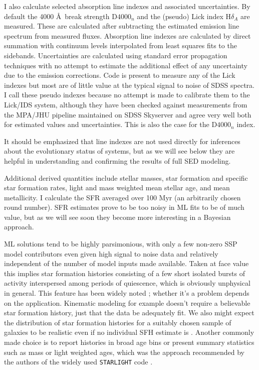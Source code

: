 \documentclass[modern]{aastex62}
\begin{document}
I also calculate selected absorption line indexes and associated uncertainties. By default the 4000 \AA~break strength D$4000_n$ \citep{1999ApJ...527...54B} and the (pseudo) Lick index H$\delta_A$ \citep{1997ApJS..111..377W} are measured. These are calculated after subtracting the estimated emission line spectrum from measured fluxes. Absorption line indexes are calculated by direct summation with continuum levels interpolated from least squares fits to the sidebands. Uncertainties are calculated using standard error propagation techniques with no attempt to estimate the additional effect of any uncertainty due to the emission corrections. Code is present to measure any of the Lick indexes \citep{1994ApJS...94..687W} but most are of little value at the typical signal to noise of SDSS spectra. I call these pseudo indexes because no attempt is made to calibrate them to the Lick/IDS system, although they have been checked against measurements from the MPA/JHU pipeline \citep{2004astro.ph..6220B} maintained on SDSS Skyserver and agree very well both for estimated values and uncertainties. This is also the case for the D$4000_n$ index.

It should be emphasized that line indexes are not used directly for inferences about the evolutionary status of systems, but as we will see below they are helpful in understanding and confirming the results of full SED modeling.

Additional derived quantities include stellar masses, star formation and specific star formation rates, light and mass weighted mean stellar age, and mean metallicity. I calculate the SFR averaged over 100 Myr (an arbitrarily chosen round number). SFR estimates prove to be too noisy in ML fits to be of much value, but as we will see soon they become more interesting in a Bayesian approach.

ML solutions tend to be highly parsimonious, with only a few non-zero SSP model contributors even given high signal to noise data and relatively independent of the number of model inputs made available. Taken at face value this implies star formation histories consisting of a few short isolated bursts of activity interspersed among periods of quiescence, which is obviously unphysical in general. This feature has been widely noted \citep{2011Ap&SS.331....1W, 2005MNRAS.358..363C}; whether it's a problem depends on the application. Kinematic modeling for example doesn't require a believable star formation history, just that the data be adequately fit. We also might expect the distribution of star formation histories for a suitably chosen sample of galaxies to be realistic even if no individual SFH estimate is \citep{2015MNRAS.448.3484M, 2007MNRAS.375L..16C}. Another commonly made choice is to report histories in broad age bins or present summary statistics such as mass or light weighted ages, which was the approach recommended by the authors of the widely used \texttt{STARLIGHT} code \citep{2005MNRAS.358..363C}. 
\end{document}
